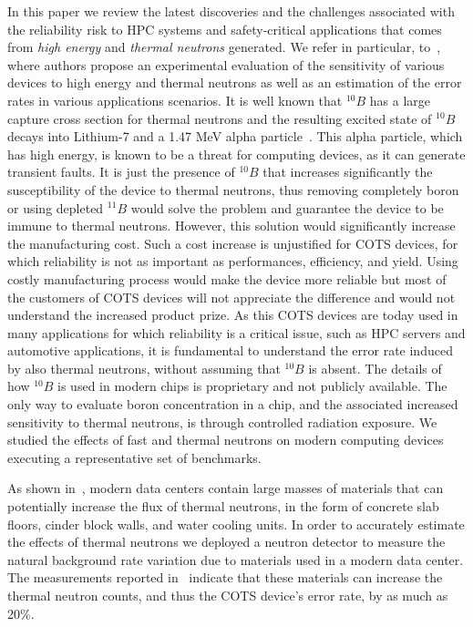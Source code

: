 In this paper we review the latest discoveries and the challenges associated with the reliability risk to HPC systems and safety-critical applications that comes from \textit{high energy} and \textit{thermal neutrons} generated. We refer in particular, to~\cite{ets2020, jsc2020}, where authors propose an experimental evaluation of the sensitivity of various devices to high energy and thermal neutrons as well as an estimation of the error rates in various applications scenarios.
It is well known that $^{10}B$ has a large capture cross section for thermal neutrons and the resulting excited state of $^{10}B$ decays into Lithium-7 and a 1.47 MeV alpha particle~\cite{ziegler2004ser, Baumann2005}. This alpha particle, which has high energy, is known to be a threat for computing devices, as it can generate transient faults. It is just the presence of $^{10}B$ that increases significantly the susceptibility of the device to thermal neutrons, thus removing completely boron or using depleted $^{11}B$ would solve the problem and guarantee the device to be immune to thermal neutrons. However, this solution would significantly increase the manufacturing cost. Such a cost increase is unjustified for COTS devices, for which reliability is not as important as performances, efficiency, and yield. Using costly manufacturing process would make the device more reliable but most of the customers of COTS devices will not appreciate the difference and would not understand the increased product prize. As this COTS devices are today used in many applications for which reliability is a critical issue, such as HPC servers and automotive applications, it is fundamental to understand the error rate induced by also thermal neutrons, without assuming that $^{10}B$ is absent. The details of how  $^{10}B$ is used in modern chips is proprietary and not publicly available. The only way to evaluate boron concentration in a chip, and the associated increased sensitivity to thermal neutrons, is through controlled radiation exposure. We studied the effects of fast and thermal neutrons on modern computing devices executing a representative set of benchmarks.

As shown in~\cite{jsc2020}, modern data centers contain large masses of materials that can potentially increase the flux of thermal neutrons, in the form of concrete slab floors, cinder block walls, and water cooling units. In order to accurately estimate the effects of thermal neutrons we deployed a neutron detector to measure the natural background rate variation due to materials used in a modern data center. The measurements reported in~\cite{jsc2020} indicate that these materials  can increase the thermal neutron counts, and thus the COTS device's error rate, by as much as 20\%. 


